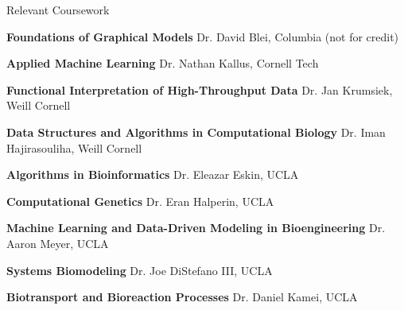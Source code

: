 \documentclass{resume} %
\begin{document}

\begin{rSection}{Relevant Coursework}

\item \textbf{Foundations of Graphical Models} \newline
Dr. David Blei, Columbia (not for credit)

\item \textbf{Applied Machine Learning} \newline
Dr. Nathan Kallus, Cornell Tech

\item \textbf{Functional Interpretation of High-Throughput Data} \newline
Dr. Jan Krumsiek, Weill Cornell

\item \textbf{Data Structures and Algorithms in Computational Biology} \newline
Dr. Iman Hajirasouliha, Weill Cornell

\item \textbf{Algorithms in Bioinformatics} \newline
Dr. Eleazar Eskin, UCLA

\item \textbf{Computational Genetics} \newline
Dr. Eran Halperin, UCLA

\item \textbf{Machine Learning and Data-Driven Modeling in Bioengineering} \newline
Dr. Aaron Meyer, UCLA

\item \textbf{Systems Biomodeling} \newline
Dr. Joe DiStefano III, UCLA

\item \textbf{Biotransport and Bioreaction Processes} \newline
Dr. Daniel Kamei, UCLA

\end{rSection}
\end{document}
